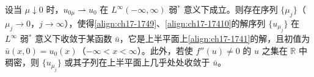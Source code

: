 \documentclass[../../main.tex]{subfiles}
\begin{document}
\begin{theorem}[标量守恒律的消失黏性极限]\label{theorem:ch17-标量消失黏性}
设当 $\mu\downarrow0$ 时，$u_{0\mu}\rightharpoonup u_0$ 在 $L^\infty(-\infty,\infty)$ 弱$^*$ 意义下成立。则存在序列 $\{\mu_j\}$（$\mu_j\to0$，$j\to\infty$），使得\eqref{align:ch17-1749}、\eqref{align:ch17-17410}的解序列 $\{u_{\mu_j}\}$ 在 $L^\infty$ 弱$^*$ 意义下收敛于某函数 $\bar u$，它是上半平面上\eqref{align:ch17-1741}的解，且初值为 $\bar u(x,0)=u_0(x)$（$-\infty<x<\infty$）。此外，若使 $f''(u)\neq0$ 的 $u$ 之集在 $\mathbb{R}$ 中稠密，则 $\{u_{\mu_j}\}$ 或其子列在上半平面上几乎处处收敛于 $\bar u$。
\end{theorem}
\end{document}
